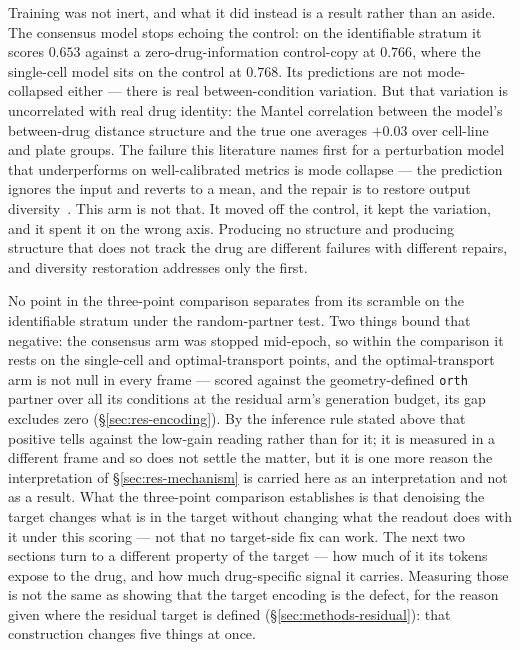 Training was not inert, and what it did instead is a result rather than an aside. The consensus
model stops echoing the control: on the identifiable stratum it scores $0.653$ against a
zero-drug-information control-copy at $0.766$, where the single-cell model sits on the control at
$0.768$. Its predictions are not mode-collapsed either --- there is real between-condition
variation. But that variation is uncorrelated with real drug identity: the Mantel correlation
between the model's between-drug distance structure and the true one averages $+0.03$ over
cell-line and plate groups. The failure this literature names first for a perturbation model that
underperforms on well-calibrated metrics is mode collapse --- the prediction ignores the input and
reverts to a mean, and the repair is to restore output diversity~\cite{mejia}. This arm is not
that. It moved off the control, it kept the variation, and it spent it on the wrong axis. Producing
no structure and producing structure that does not track the drug are different failures with
different repairs, and diversity restoration addresses only the first.

\begin{claim}
No point in the three-point comparison separates from its scramble on the identifiable stratum under the
random-partner test. Two things bound that negative: the consensus arm was stopped mid-epoch, so
within the comparison it rests on the single-cell and optimal-transport points, and the
optimal-transport arm is not null in every frame --- scored against the geometry-defined
\texttt{orth} partner over all
its conditions at the residual arm's generation budget, its gap excludes zero
(\S\ref{sec:res-encoding}). By the inference rule stated above that positive tells against the
low-gain reading rather than for it; it is measured in a different frame and so does not settle the
matter, but it is one more reason the interpretation of \S\ref{sec:res-mechanism} is carried here as
an interpretation and not as a result. What the three-point comparison establishes is that denoising the target changes what is
in the target without changing what the readout does with it under this scoring --- not that no
target-side fix can work. The next two sections turn to a different property of
the target --- how much of it its tokens expose to the drug, and how much drug-specific signal it
carries. Measuring those is not the same as showing that the target encoding is the defect, for the
reason given where the residual target is defined (\S\ref{sec:methods-residual}): that construction
changes five things at once.
\end{claim}

